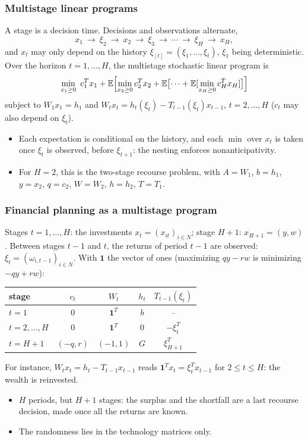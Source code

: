\documentclass[aspectratio=169]{beamer}
\begin{document}
\begin{frame}
\frametitle{Multistage linear programs}

A {\red stage} is a decision time.
Decisions and observations alternate,
\[
x_1 \ \to\ \xi_2 \ \to\ x_2 \ \to\ \xi_3 \ \to\ \cdots \ \to\ \xi_H \ \to\ x_H,
\]
and $x_t$ may only depend on the history $\xi_{[t]} = (\xi_1, \ldots, \xi_t)$, $\xi_1$ being deterministic.
Over the horizon $t = 1, \ldots, H$, the multistage stochastic linear program is
\[
\min_{x_1 \geq 0}\ c_1^T x_1 + {\mathbb{E}}\Bigl[ \min_{x_2 \geq 0} c_2^T x_2 + {\mathbb{E}}\bigl[ \cdots + {\mathbb{E}}[ \min_{x_H \geq 0} c_H^T x_H ] \bigr] \Bigr]
\]
subject to $W_1 x_1 = h_1$ and $W_t x_t = h_t(\xi_t) - T_{t-1}(\xi_t) x_{t-1}$, $t = 2, \ldots, H$ ($c_t$ may also depend on $\xi_t$).
\begin{itemize}
\item
Each expectation is conditional on the history, and each $\min$ over $x_t$ is taken once $\xi_t$ is observed, before $\xi_{t+1}$: the nesting enforces nonanticipativity.
\item
For $H = 2$, this is the two-stage recourse problem, with $A = W_1$, $b = h_1$, $y = x_2$, $q = c_2$, $W = W_2$, $h = h_2$, $T = T_1$.
\end{itemize}

\end{frame}

\begin{frame}
\frametitle{Financial planning as a multistage program}

Stages $t = 1, \ldots, H$: the investments $x_t = (x_{it})_{i \in N}$; stage $H + 1$: $x_{H+1} = (y, w)$.
Between stages $t-1$ and $t$, the returns of period $t-1$ are observed: $\xi_t = (\omega_{i,t-1})_{i \in N}$.
With $\mathbf{1}$ the vector of ones (maximizing $qy - rw$ is minimizing $-qy + rw$):
\begin{center}
\begin{tabular}{lcccc}
\hline
stage & $c_t$ & $W_t$ & $h_t$ & $T_{t-1}(\xi_t)$ \\
\hline
$t = 1$ & $0$ & $\mathbf{1}^T$ & $b$ & -- \\
$t = 2, \ldots, H$ & $0$ & $\mathbf{1}^T$ & $0$ & $-\xi_t^T$ \\
$t = H + 1$ & $(-q, r)$ & $(-1, 1)$ & $G$ & $\xi_{H+1}^T$ \\
\hline
\end{tabular}
\end{center}
For instance, $W_t x_t = h_t - T_{t-1} x_{t-1}$ reads $\mathbf{1}^T x_t = \xi_t^T x_{t-1}$ for $2 \leq t \leq H$: the wealth is reinvested.
\begin{itemize}
\item
$H$ periods, but $H + 1$ stages: the surplus and the shortfall are a last recourse decision, made once all the returns are known.
\item
The randomness lies in the technology matrices only.
\end{itemize}

\end{frame}
\end{document}
